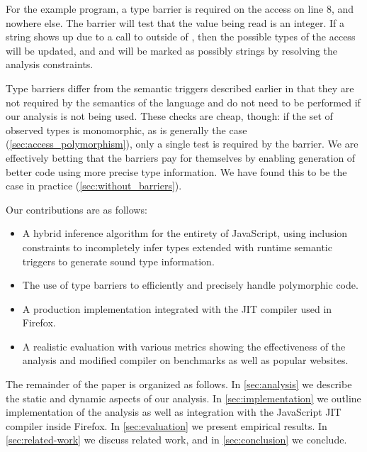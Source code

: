 For the example program, a type barrier is required on the  access
on line 8, and nowhere else. The barrier will test that the value being read
is an integer. If a string shows up due to a call to 
outside of , then the possible types of the  access
will be updated, and  and  will be marked as possibly
strings by resolving the analysis constraints.

Type barriers differ from the semantic triggers described earlier in that
they are not required by the semantics of the language and do not need to
be performed if our analysis is not being used.
These checks are cheap, though: if the set of observed types is monomorphic,
as is generally the case (\Section\ref{sec:access_polymorphism}),
only a single test is required by the barrier.
We are effectively betting that the barriers
pay for themselves by enabling generation of better code using more precise type information.
We have found this to be the case in practice (\Section\ref{sec:without_barriers}).

Our contributions are as follows:

\begin{itemize}


\item A hybrid inference algorithm for the entirety of JavaScript, using inclusion
constraints to incompletely infer types extended with runtime semantic triggers
to generate sound type information.

\item The use of type barriers to efficiently and precisely handle
polymorphic code.

\item A production implementation integrated with the JIT compiler used in
Firefox.

\item A realistic evaluation with various metrics showing the effectiveness of the analysis
and modified compiler on benchmarks as well as popular websites.

\end{itemize}

The remainder of the paper is organized as follows. In \Section\ref{sec:analysis}
we describe the static and dynamic aspects of our
analysis. In \Section\ref{sec:implementation} we outline implementation of the
analysis as well as integration with the JavaScript JIT compiler inside
Firefox. In \Section\ref{sec:evaluation} we present empirical
results. In \Section\ref{sec:related-work} we discuss related work, and in
\Section\ref{sec:conclusion} we conclude.


